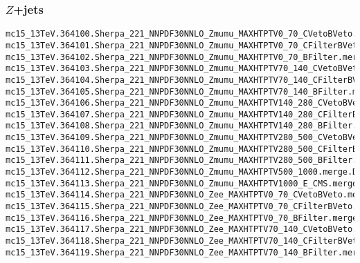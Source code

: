 \begin{scriptsize}
\subsubsection{$Z$+jets}
\scriptsize
\begin{verbatim}
mc15_13TeV.364100.Sherpa_221_NNPDF30NNLO_Zmumu_MAXHTPTV0_70_CVetoBVeto.merge.DAOD_HIGG5D2.e5271_s2726_r7772_r7676_p2949
mc15_13TeV.364101.Sherpa_221_NNPDF30NNLO_Zmumu_MAXHTPTV0_70_CFilterBVeto.merge.DAOD_HIGG5D2.e5271_s2726_r7772_r7676_p2949
mc15_13TeV.364102.Sherpa_221_NNPDF30NNLO_Zmumu_MAXHTPTV0_70_BFilter.merge.DAOD_HIGG5D2.e5271_s2726_r7772_r7676_p2949
mc15_13TeV.364103.Sherpa_221_NNPDF30NNLO_Zmumu_MAXHTPTV70_140_CVetoBVeto.merge.DAOD_HIGG5D2.e5271_s2726_r7772_r7676_p2949
mc15_13TeV.364104.Sherpa_221_NNPDF30NNLO_Zmumu_MAXHTPTV70_140_CFilterBVeto.merge.DAOD_HIGG5D2.e5271_s2726_r7772_r7676_p2949
mc15_13TeV.364105.Sherpa_221_NNPDF30NNLO_Zmumu_MAXHTPTV70_140_BFilter.merge.DAOD_HIGG5D2.e5271_s2726_r7772_r7676_p2949
mc15_13TeV.364106.Sherpa_221_NNPDF30NNLO_Zmumu_MAXHTPTV140_280_CVetoBVeto.merge.DAOD_HIGG5D2.e5271_s2726_r7772_r7676_p2949
mc15_13TeV.364107.Sherpa_221_NNPDF30NNLO_Zmumu_MAXHTPTV140_280_CFilterBVeto.merge.DAOD_HIGG5D2.e5271_s2726_r7772_r7676_p2949
mc15_13TeV.364108.Sherpa_221_NNPDF30NNLO_Zmumu_MAXHTPTV140_280_BFilter.merge.DAOD_HIGG5D2.e5271_s2726_r7772_r7676_p2949
mc15_13TeV.364109.Sherpa_221_NNPDF30NNLO_Zmumu_MAXHTPTV280_500_CVetoBVeto.merge.DAOD_HIGG5D2.e5271_s2726_r7772_r7676_p2949
mc15_13TeV.364110.Sherpa_221_NNPDF30NNLO_Zmumu_MAXHTPTV280_500_CFilterBVeto.merge.DAOD_HIGG5D2.e5271_s2726_r7772_r7676_p2949
mc15_13TeV.364111.Sherpa_221_NNPDF30NNLO_Zmumu_MAXHTPTV280_500_BFilter.merge.DAOD_HIGG5D2.e5271_s2726_r7772_r7676_p2949
mc15_13TeV.364112.Sherpa_221_NNPDF30NNLO_Zmumu_MAXHTPTV500_1000.merge.DAOD_HIGG5D2.e5271_s2726_r7772_r7676_p2949
mc15_13TeV.364113.Sherpa_221_NNPDF30NNLO_Zmumu_MAXHTPTV1000_E_CMS.merge.DAOD_HIGG5D2.e5271_s2726_r7772_r7676_p2949
mc15_13TeV.364114.Sherpa_221_NNPDF30NNLO_Zee_MAXHTPTV0_70_CVetoBVeto.merge.DAOD_HIGG5D2.e5299_s2726_r7772_r7676_p2949
mc15_13TeV.364115.Sherpa_221_NNPDF30NNLO_Zee_MAXHTPTV0_70_CFilterBVeto.merge.DAOD_HIGG5D2.e5299_s2726_r7772_r7676_p2949
mc15_13TeV.364116.Sherpa_221_NNPDF30NNLO_Zee_MAXHTPTV0_70_BFilter.merge.DAOD_HIGG5D2.e5299_s2726_r7772_r7676_p2949
mc15_13TeV.364117.Sherpa_221_NNPDF30NNLO_Zee_MAXHTPTV70_140_CVetoBVeto.merge.DAOD_HIGG5D2.e5299_s2726_r7772_r7676_p2949
mc15_13TeV.364118.Sherpa_221_NNPDF30NNLO_Zee_MAXHTPTV70_140_CFilterBVeto.merge.DAOD_HIGG5D2.e5299_s2726_r7772_r7676_p2949
mc15_13TeV.364119.Sherpa_221_NNPDF30NNLO_Zee_MAXHTPTV70_140_BFilter.merge.DAOD_HIGG5D2.e5299_s2726_r7772_r7676_p2949

\end{verbatim}
\end{scriptsize}
